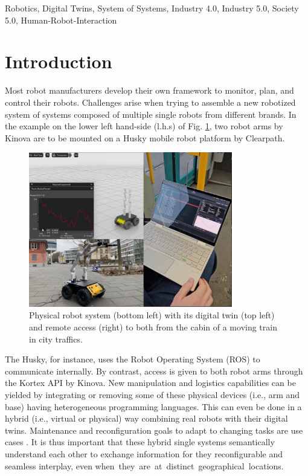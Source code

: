 \documentclass[conference]{IEEEtran}
\begin{document}
\begin{IEEEkeywords}
Robotics, Digital Twins, System of Systems, Industry 4.0, Industry 5.0, Society 5.0, Human-Robot-Interaction
\end{IEEEkeywords}

\section{Introduction}
Most robot manufacturers develop their own framework to monitor, plan, and control their robots. Challenges arise when trying to assemble a new robotized system of systems composed of multiple single robots from different brands.
In the example  on the lower left hand-side (l.h.s) of Fig. \ref{fig:TitelBild}, two robot arms by Kinova are to be mounted on a Husky mobile robot platform by Clearpath.
\begin{figure}[htbp]
    \centerline{\includegraphics[width=8.9cm]{Pictures/TitelBild.png}}
    \caption{Physical robot system (bottom left) with its digital twin (top left) and remote access (right) to both from the cabin of a moving train in city traffics.}
    \label{fig:TitelBild}
\end{figure}
The Husky, for instance, uses the Robot Operating System (ROS) to communicate internally. By contrast, access is given to both robot arms through the Kortex API by Kinova. New manipulation and logistics capabilities can be yielded by integrating or removing  some of these physical devices (i.e., arm and  base) having heterogeneous programming languages. This can even be done  in a hybrid (i.e., virtual or physical) way   combining real robots with  their digital twins.  Maintenance and reconfiguration goals  to adapt to changing tasks are  use cases \cite{mbakop2023integrated}. It is thus important that these hybrid  single systems  semantically understand each other to exchange information for they reconfigurable and seamless interplay, even \mbox{when they are  at distinct geographical locations.}  
\end{document}
